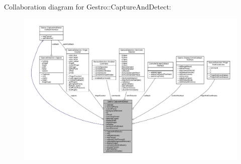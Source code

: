 Collaboration diagram for Gestro\+:\+:Capture\+And\+Detect\+:
\nopagebreak
\begin{figure}[H]
\begin{center}
\leavevmode
\includegraphics[width=350pt]{class_gestro_1_1_capture_and_detect__coll__graph}
\end{center}
\end{figure}
